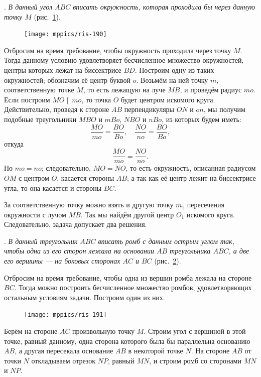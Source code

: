 \documentclass[oneside]{book}
\begin{document}
\smallskip
{}.
\emph{В данный угол $ABC$ вписать окружность, которая проходила бы через данную точку $M$} (рис.~\ref{1938/ris-190}).

\begin{figure}[h]
\centering
\texttt{[image: mppics/ris-190]}
\caption{}\label{1938/ris-190}
\end{figure}

Отбросим на время требование, чтобы окружность проходила через точку $M$.
Тогда данному условию удовлетворяет бесчисленное множество окружностей, центры которых лежат на биссектрисе $BD$.
Построим одну из таких окружностей; обозначим её центр буквой $o$. 
Возьмём на ней точку $m$, соответственную точке $M$, то есть лежащую на луче $MB$, и проведём радиус $mo$.
Если построим $MO\parallel mo$, то точка $O$ будет центром искомого круга.
Действительно, проведя к стороне $AB$ перпендикуляры $ON$ и $on$, мы получим подобные треугольники $MBO$ и $mBo$, $NBO$ и $nBo$, из которых будем иметь:
\[\frac{MO}{mo} = \frac{BO}{Bo}, \quad 
 \frac{NO}{no} = \frac{BO}{Bo},
\]
откуда 
\[\frac{MO}{mo} = \frac{NO}{no}.\]
Но $mo =no$;
следовательно, $MO=NO$, то есть окружность, описанная радиусом $OM$ с центром $O$, касается стороны $AB$;
а так как её центр лежит на биссектрисе угла, то она касается и стороны $BC$.

За соответственную точку можно взять и другую точку $m_1$ пересечения окружности с лучом $MB$.
Так мы найдём другой центр $O_1$ искомого круга.
Следовательно, задача допускает два решения.

\medskip

\smallskip
{}.
\emph{В данный треугольник $ABC$ вписать ромб с данным острым углом так, чтобы одна из его сторон лежала на основании $AB$ треугольника $ABC$, а две его вершины — на боковых сторонах $AC$ и $BC$} (рис.~\ref{1938/ris-191}).

Отбросим на время требование, чтобы одна из вершин ромба лежала на стороне $BC$.
Тогда можно построить бесчисленное множество ромбов, удовлетворяющих остальным условиям задачи.
Построим один из них.

\begin{figure}
\centering
\texttt{[image: mppics/ris-191]}
\caption{}\label{1938/ris-191}
\end{figure}

Берём на стороне $AC$ произвольную точку $M$.
Строим угол с вершиной в этой точке, равный данному, одна сторона которого была бы параллельна основанию $AB$, а другая пересекала основание $AB$ в некоторой точке $N$.
На стороне $AB$ от точки $N$ откладываем отрезок $NP$, равный $MN$, и строим ромб со сторонами $MN$ и $NP$.
\end{document}

